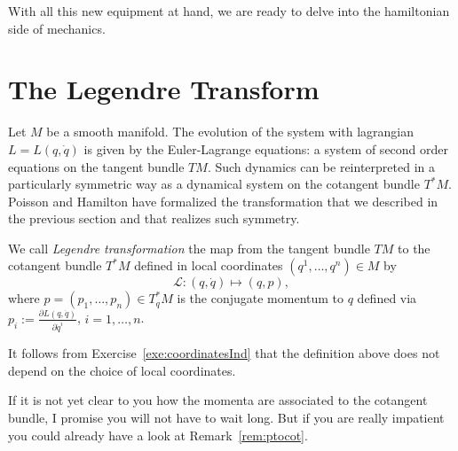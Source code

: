 \documentclass[english,fontsize=11pt,paper=b5]{scrbook}
\theoremstyle{definition}
\begin{document}
    With all this new equipment at hand, we are ready to delve into the hamiltonian side of mechanics.

    \section{The Legendre Transform}

    Let $M$ be a smooth manifold.
    The evolution of the system with lagrangian $L=L(q,\dot q)$ is given by the Euler-Lagrange equations: a system of second order equations on the tangent bundle $TM$.
    Such dynamics can be reinterpreted in a particularly symmetric way as a dynamical system on the cotangent bundle $T^*M$.
    Poisson and Hamilton have formalized the transformation that we described in the previous section and that realizes such symmetry.

    \begin{tcolorbox}
      We call \emph{Legendre transformation} the map from the tangent bundle $TM$ to the cotangent bundle $T^*M$ defined in local coordinates $(q^1, \ldots, q^n)\in M$ by
      \begin{equation}\label{eq:legrendreTrafo}
        \mathcal{L}: (q,\dot q) \mapsto (q,p),
      \end{equation}
      where $p = (p_1, \ldots, p_n) \in T^*_q M$ is the conjugate momentum to $q$ defined via $p_i := \frac{\partial L(q,\dot q)}{\partial \dot q^i}$, $i=1,\ldots,n$.
    \end{tcolorbox}
    It follows from Exercise~\ref{exe:coordinatesInd} that the definition above does not depend on the choice of local coordinates.


    If it is not yet clear to you how the momenta are associated to the cotangent bundle, I promise you will not have to wait long. But if you are really impatient you could already have a look at Remark~\ref{rem:ptocot}.
\end{document}
